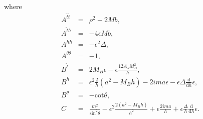 \documentclass[12pt]{article}
\begin{document}
where
\begin{eqnarray}
A^{\tilde t\tilde t}&=&\rho^2+2Mb,\nonumber\\
A^{\tilde t h}&=&-4\epsilon Mb,\nonumber\\
A^{hh}&=&-\epsilon^2 \Delta,\nonumber\\
A^{\theta\theta}&=&-1,\nonumber\\
B^{\tilde t}&=&2M_B\epsilon-\epsilon\frac{12A_\lambda M_B^2}{h},\nonumber \\
B^h&=&\epsilon^2  \frac 2h(a^2-M_Bh) -2ima\epsilon-\epsilon\Delta \frac{\mathrm d} {\mathrm d h}\epsilon,\nonumber\\
B^\theta&=&-\mathrm{cot}\theta,\nonumber\\
C&=&\frac{m^2}{\mathrm{sin}^2\theta}-\epsilon^2\frac{2(a^2-M_Bh)}{h^2}+\epsilon\frac{2ima}h+\epsilon\frac\Delta h  \frac{\mathrm d} {\mathrm d h}\epsilon.
\end{eqnarray}
\end{document}
